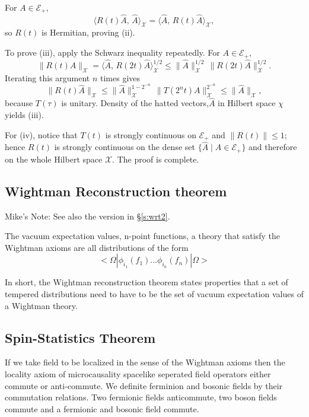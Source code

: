 \documentclass{article}
\newcommand{\1}{\mathbbm{1}}
\theoremstyle{plain}
\theoremstyle{definition}
\numberwithin{equation}{section}
\newcommand\MRD[1]{{\color{red} Mike's Note: #1}}
\begin{document}
For \(A\in\mathcal{E}_{+}\),
\[
\langle R(t)\widehat{A},\,\widehat{A}\rangle_{\mathcal X}
  =\langle\widehat{A},\,R(t)\widehat{A}\rangle_{\mathcal X},
\]
so \(R(t)\) is Hermitian, proving (ii).

To prove (iii), apply the Schwarz inequality repeatedly.  For
\(A\in\mathcal{E}_{+}\),
\[
\|R(t)\widehat{A}\|_{\mathcal X}
  =\bigl\langle\widehat{A},\,R(2t)\widehat{A}\bigr\rangle_{\mathcal X}^{1/2}
  \le\|\widehat{A}\|_{\mathcal X}^{1/2}\,
      \|R(2t)\widehat{A}\|_{\mathcal X}^{1/2}.
\]
Iterating this argument \(n\) times gives
\[
\|R(t)\widehat{A}\|_{\mathcal X}
  \le\|\widehat{A}\|_{\mathcal X}^{1-2^{-n}}\,
      \|T(2^{n}t)A\|_{\mathcal X}^{2^{-n}}
  \le\|\widehat{A}\|_{\mathcal X},
\]
because \(T(\tau)\) is unitary.  Density of the hatted vectors,$\hat{A}$ in Hilbert space $\mathcal{\chi}$ yields (iii).

For (iv), notice that \(T(t)\) is strongly continuous on
\(\mathcal{E}_{+}\) and \(\lVert R(t)\rVert\le1\); hence \(R(t)\) is
strongly continuous on the dense set
\(\{\widehat{A}\mid A\in\mathcal{E}_{+}\}\) and therefore on the whole
Hilbert space \(\mathcal X\).  The proof is complete.






\subsection{Wightman Reconstruction theorem} \label{wightmantheorem}
\label{ss:wrt}

\MRD{See also the version in \S \ref{s:wrt2}.}

The vacuum expectation values, n-point functions, a theory that satisfy the Wightman axioms are all distributions of the form
\begin{equation}
    < \Omega | \phi_{i_1} (f_1) \ldots \phi_{i_n}(f_n) | \Omega> 
\end{equation}

In short, the Wightman reconstruction theorem states properties that a set of tempered distributions need to have to be the set of vacuum expectation values of a Wightman theory. 

\subsection{Spin-Statistics Theorem}\label{spintheorem}

If we take field to be localized in the sense of the Wightman axioms then the locality axiom of microcausality spacelike seperated field operators either commute or anti-commute. We definite ferminion and bosonic fields by their commutation relations. Two fermionic fields anticommute, two boson fields commute and a fermionic and bosonic field commute. 
\end{document}
